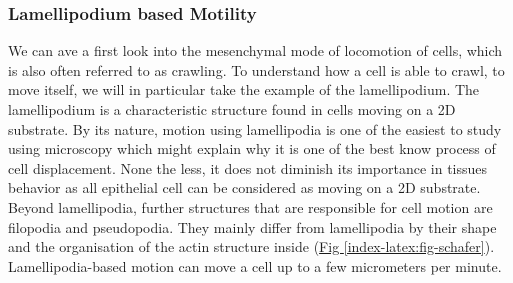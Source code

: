\documentclass[A4paperpaper,11pt,english]{sphinxmanual}
\begin{document}
\subsubsection{Lamellipodium based Motility}
\label{index-latex:lamellipodium-based-motility}
We can ave a first look into the mesenchymal mode of locomotion of cells, which is
also often referred to as crawling. To understand how a cell is able to crawl,
to move itself, we will in particular take the example of the lamellipodium.
The lamellipodium is a characteristic structure found in cells moving on a 2D substrate. By
its nature, motion using lamellipodia is one of the easiest to study using
microscopy which might explain why it is one of the best know process of cell
displacement. None the less, it does not diminish its importance in tissues
behavior as all epithelial cell can be considered as moving on a 2D substrate.
Beyond lamellipodia, further structures that are responsible for cell motion are
filopodia and pseudopodia. They mainly differ from lamellipodia by their shape
and the organisation of the actin structure inside (\hyperref[index-latex:fig-schafer]{Fig  \ref*{index-latex:fig-schafer}}). Lamellipodia-based motion
can move a cell up to a few micrometers per minute.
\end{document}
